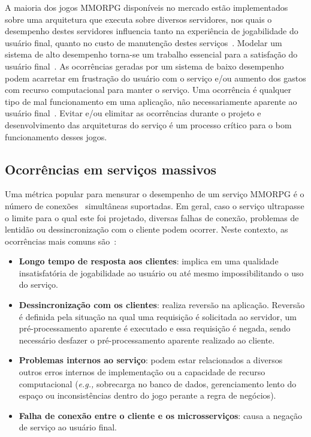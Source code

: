 A maioria dos jogos \ac{MMORPG} disponíveis no mercado estão implementados sobre uma arquitetura que executa sobre diversos servidores, nos quais o desempenho destes servidores influencia tanto na experiência de jogabilidade do usuário final, quanto no custo de manutenção destes serviços~\cite{1417630}.
%
Modelar um sistema de alto desempenho torna-se um trabalho essencial para a satisfação do usuário final~\cite{1417630}.
%
As ocorrências geradas por um sistema de baixo desempenho podem acarretar em frustração do usuário com o serviço e/ou aumento dos gastos com recurso computacional para manter o serviço.
%
Uma ocorrência é qualquer tipo de mal funcionamento em uma aplicação, não necessariamente aparente ao usuário final~\cite{1417630}.
%
Evitar e/ou elimitar as ocorrências durante o projeto e desenvolvimento das arquiteturas do serviço é um processo crítico para o bom funcionamento desses jogos.

\subsection{Ocorrências em serviços massivos}
\label{sec:ocorrencias}

Uma métrica popular para mensurar o desempenho de um serviço \ac{MMORPG} é o número de conexões~\cite{1417630} simultâneas suportadas.
%
Em geral, caso o serviço ultrapasse o limite para o qual este foi projetado, diversas falhas de conexão, problemas de lentidão ou dessincronização com o cliente podem ocorrer.
%
Neste contexto, as ocorrências mais comuns são~\cite{1417630}:

\begin{itemize}
  \item \textbf{Longo tempo de resposta aos clientes}: implica em uma qualidade insatisfatória de jogabilidade ao usuário ou até mesmo impossibilitando o uso do serviço.
  \item \textbf{Dessincronização com os clientes}: realiza reversão na aplicação. Reversão é definida pela situação na qual uma requisição é solicitada ao servidor, um pré-processamento aparente é executado e essa requisição é negada, sendo necessário desfazer o pré-processamento aparente realizado ao cliente.
  \item \textbf{Problemas internos ao serviço}:  podem estar relacionados a diversos outros erros internos de implementação ou a capacidade de recurso computacional (\textit{e.g.,} sobrecarga no banco de dados, gerenciamento lento do espaço ou inconsistências dentro do jogo perante a regra de negócios).
  \item \textbf{Falha de conexão entre o cliente e os microsserviços}: causa a negação de serviço ao usuário final.
\end{itemize}

